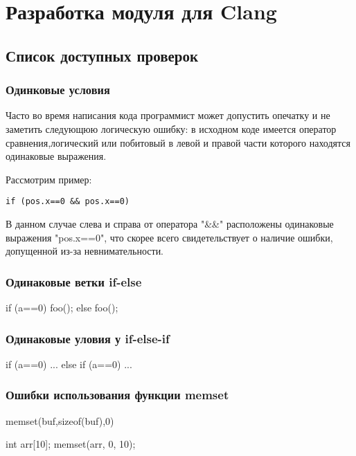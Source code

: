 \chapter{Разработка модуля для Clang}

\section{Список доступных проверок}

\subsection{Одинковые условия}
Часто во время написания кода программист может допустить опечатку и не заметить следующюю
логическую ошибку: в исходном коде имеется оператор сравнения,логический или побитовый в левой 
и правой части которого находятся одинаковые выражения. 

Рассмотрим пример:
\begin{lstlisting}
if (pos.x==0 && pos.x==0)
\end{lstlisting}

В данном случае слева и справа от оператора "\&\&" расположены одинаковые выражения "pos.x==0",
что скорее всего свидетельствует о наличие ошибки, допущенной из-за невнимательности.

\subsection{Одинаковые ветки if-else}
if (a==0) 
{foo();} 
else 
{foo();}

\subsection{Одинаковые уловия у if-else-if}
if (a==0)
{...}
else if (a==0)
{...}

\subsection{Ошибки использования функции memset}
memset(buf,sizeof(buf),0)

int arr[10];
memset(arr, 0, 10);

